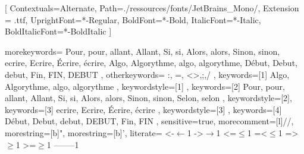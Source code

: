 \setmonofont{JetBrainsMono}[
  Contextuals={Alternate},
  Path=./ressources/fonts/JetBrains_Mono/,
  Extension = .ttf,
  UprightFont=*-Regular,
  BoldFont=*-Bold,
  ItalicFont=*-Italic,
  BoldItalicFont=*-BoldItalic
]

{
	morekeywords={
    Pour, pour, allant, Allant, Si, si, Alors, alors, Sinon, sinon,
    ecrire, Ecrire, Écrire, écrire, Algo, Algorythme, algo, 
    algorythme, Début, Debut, debut, Fin, FIN, DEBUT
	},
	otherkeywords={
		:, =, <>,;,/
	},
  keywords=[1]{
    Algo, Algorythme, algo, algorythme
  },
  keywordstyle=[1]{
    \bfseries\color{red!75}
  },
	keywords=[2]{
    Pour, pour, allant, Allant, Si, si, Alors, alors, Sinon, sinon, 
    Selon, selon 
	},
	keywordstyle=[2]\color{blue!75},
 keywords=[3]{
  ecrire, Ecrire, Écrire, écrire
 },
 keywordstyle=[3]{
  \color{green!50!black}
 },
 keywords=[4]{
  Début, Debut, debut, DEBUT, Fin, FIN
 },
	sensitive=true,
	morecomment=[l]{//}, 
	morestring=[b]{"},
	morestring=[b]{'},
  literate=
      {<-}{$\leftarrow$}{1}%
      {->}{$\rightarrow$}{1}%
      {<=}{$\leq$}{1}%
      {=<}{$\leq$}{1}%
      {=>}{$\geq$}{1}%
      {>=}{$\geq$}{1}%
      {--}{{{\color{blue}——}}}{1}}




\newcommand{\algorythme}[1]{
        
    }